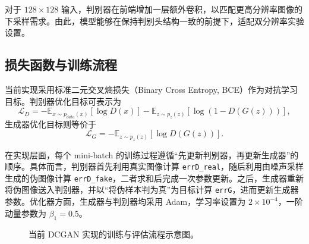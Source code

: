 \documentclass[12pt, a4paper, UTF8]{ctexart}
\begin{document}
对于 $128\times128$ 输入，判别器在前端增加一层额外卷积，以匹配更高分辨率图像的下采样需求。由此，模型能够在保持判别头结构一致的前提下，适配双分辨率实验设置。

\subsection{损失函数与训练流程}

当前实现采用标准二元交叉熵损失（Binary Cross Entropy, BCE）作为对抗学习目标。判别器优化目标可表示为
\begin{equation}
\mathcal{L}_D = -\mathbb{E}_{x \sim p_{data}(x)}[\log D(x)]
- \mathbb{E}_{z \sim p_z(z)}[\log (1 - D(G(z)))] ,
\end{equation}
生成器优化目标则等价于
\begin{equation}
\mathcal{L}_G = -\mathbb{E}_{z \sim p_z(z)}[\log D(G(z))].
\end{equation}

在实现层面，每个 mini-batch 的训练过程遵循“先更新判别器，再更新生成器”的顺序。具体而言，判别器首先利用真实图像计算 \verb|errD_real|，随后利用由噪声采样生成的伪图像计算 \verb|errD_fake|，二者求和后完成一次参数更新。之后，生成器重新将伪图像送入判别器，并以“将伪样本判为真”为目标计算 \verb|errG|，进而更新生成器参数。优化器方面，生成器与判别器均采用 Adam，学习率设置为 $2\times10^{-4}$，一阶动量参数为 $\beta_1=0.5$。

\begin{figure}[H]
\centering
{}
\caption{当前 DCGAN 实现的训练与评估流程示意图。}
\end{figure}
\end{document}

